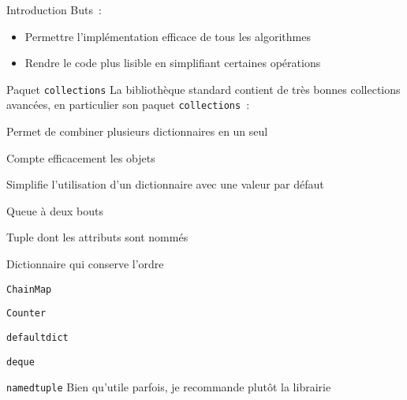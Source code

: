 \begin{frame}{Introduction}
   Buts~:
   \begin{itemize}[<+->]
     \item Permettre l'implémentation efficace de tous les algorithmes
     \item Rendre le code plus lisible en simplifiant certaines opérations
   \end{itemize}
\end{frame}

\begin{frame}{Paquet \texttt{collections}}
  La bibliothèque standard contient de très bonnes collections avancées, en particulier son paquet \texttt{collections}~:

  \begin{description}[<+->]
    \item[\texttt{ChainMap}] Permet de combiner plusieurs dictionnaires en un seul
    \item[\texttt{Counter}] Compte efficacement les objets
    \item[\texttt{defaultdict}] Simplifie l'utilisation d'un dictionnaire avec une valeur par défaut
    \item[\texttt{deque}] Queue à deux bouts
    \item[\texttt{namedtuple}] Tuple dont les attributs sont nommés
    \item[\texttt{OrderedDict}] Dictionnaire qui conserve l'ordre
  \end{description}
\end{frame}

\begin{frame}{\texttt{ChainMap}}
\end{frame}

\begin{frame}{\texttt{Counter}}
\end{frame}

\begin{frame}{\texttt{defaultdict}}
\end{frame}

\begin{frame}{\texttt{deque}}
\end{frame}

\begin{frame}{\texttt{namedtuple}}
  Bien qu'utile parfois, je recommande plutôt la librairie 

\end{frame}

